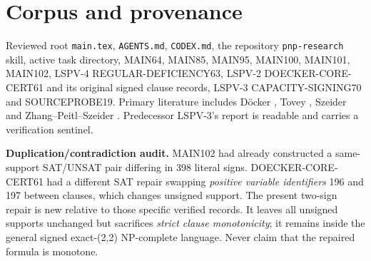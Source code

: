 \documentclass[11pt]{article}
\begin{document}
\section{Corpus and provenance}
Reviewed root \texttt{main.tex}, \texttt{AGENTS.md}, \texttt{CODEX.md}, the repository \texttt{pnp-research} skill, active task directory, MAIN64, MAIN85, MAIN95, MAIN100, MAIN101, MAIN102, LSPV-4 REGULAR-DEFICIENCY63, LSPV-2 DOECKER-CORE-CERT61 and its original signed clause records, LSPV-3 CAPACITY-SIGNING70 and SOURCEPROBE19. Primary literature includes D\"ocker \cite{docker}, Tovey \cite{tovey}, Szeider \cite{szeider} and Zhang--Peitl--Szeider \cite{zps}. Predecessor LSPV-3's report is readable and carries a verification sentinel.

\noindent\textbf{Duplication/contradiction audit.}
MAIN102 had already constructed a same-support SAT/UNSAT pair differing in 398 literal signs. DOECKER-CORE-CERT61 had a different SAT repair swapping \emph{positive variable identifiers} 196 and 197 between clauses, which changes unsigned support. The present two-sign repair is new relative to those specific verified records. It leaves all unsigned supports unchanged but sacrifices \emph{strict clause monotonicity}; it remains inside the general signed exact-(2,2) NP-complete language. Never claim that the repaired formula is monotone.
\end{document}
